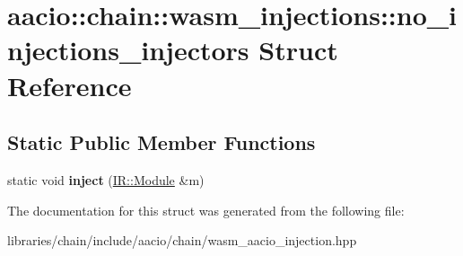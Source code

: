 \hypertarget{structaacio_1_1chain_1_1wasm__injections_1_1no__injections__injectors}{}\section{aacio\+:\+:chain\+:\+:wasm\+\_\+injections\+:\+:no\+\_\+injections\+\_\+injectors Struct Reference}
\label{structaacio_1_1chain_1_1wasm__injections_1_1no__injections__injectors}
\subsection*{Static Public Member Functions}
\begin{DoxyCompactItemize}
\item 
\mbox{\label{structaacio_1_1chain_1_1wasm__injections_1_1no__injections__injectors_a80fd55816b805c84c242225bb728feef}} 
static void {\bfseries inject} (\mbox{\hyperlink{struct_i_r_1_1_module}{I\+R\+::\+Module}} \&m)
\end{DoxyCompactItemize}


The documentation for this struct was generated from the following file\+:\begin{DoxyCompactItemize}
\item 
libraries/chain/include/aacio/chain/wasm\+\_\+aacio\+\_\+injection.\+hpp\end{DoxyCompactItemize}
